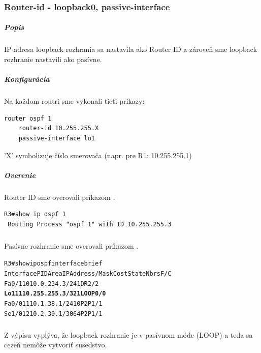 \documentclass[12pt,twoside,a4paper]{article}
\begin{document}
\subsubsection*{Router-id - loopback0, passive-interface}
\subparagraph{Popis}
\subparagraph{}
IP adresa loopback rozhrania sa nastavila ako Router ID a zároveň sme loopback rozhranie  nastavili ako pasívne.

\subparagraph{Konfigurácia}
\subparagraph{}
Na každom routri sme vykonali tieti príkazy:
\noindent
{\selectfont

\begin{small}

\begin{verbatim}
router ospf 1
    router-id 10.255.255.X
    passive-interface lo1
\end{verbatim}
\end{small}
}


'X' symbolizuje číslo smerovača (napr. pre R1: 10.255.255.1)

\subparagraph{Overenie}
\subparagraph{}
Router ID sme overovali príkazom .

\noindent
{\selectfont
\begin{small}
\begin{verbatim}
R3#show ip ospf 1
 Routing Process "ospf 1" with ID 10.255.255.3
\end{verbatim}
\end{small}
}

\subparagraph{}
Pasívne rozhranie sme overovali príkazom .

\noindent
{\selectfont
\begin{small}
\begin{alltt}

R3#show ip ospf interface brief
Interface    PID   Area            IP Address/Mask    Cost  State Nbrs F/C
Fa0/1        1     0               10.0.234.3/24      1     DR    2/2
\textbf{Lo1          1     1               10.255.255.3/32    1     LOOP  0/0}
Fa0/0        1     1               10.1.38.1/24       10    P2P   1/1
Se1/0        1     2               10.2.39.1/30       64    P2P   1/1

\end{alltt}
\end{small}
}

\subparagraph{}
Z výpisu vyplýva, že loopback rozhranie  je v pasívnom móde (LOOP) a teda sa cezeň nemôže vytvoriť susedstvo.
\end{document}
